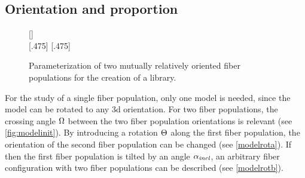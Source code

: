 \subsection{Orientation and proportion}\label{sec:modelParamet}
%
\begin{figure}[t]
\centering
\setlength{\tikzwidth}{0.40\textwidth}
{}
[\textwidth]{}
\\
%
[.475\textwidth]{}\hfill
{}
[.475\textwidth]{}
\caption{Parameterization of two mutually relatively oriented fiber populations for the creation of a library.}
\label{fig:twomodelpopdesign}
\end{figure}
%
For the study of a single fiber population, only one model is needed, since the model can be rotated to any 3d orientation. 
For two fiber populations, the crossing angle $\textnormal{$\Omega$}$ between the two fiber population orientations is relevant (see \cref{fig:modelinit}).
By introducing a rotation $\textnormal{$\Theta$}$ along the first fiber population, the orientation of the second fiber population can be changed (see \cref{modelrota}).
If then the first fiber population is tilted by an angle $\textnormal{$\alpha_{\mathit{incl}}$}$, an arbitrary fiber configuration with two fiber populations can be described (see \cref{modelrotb}).
